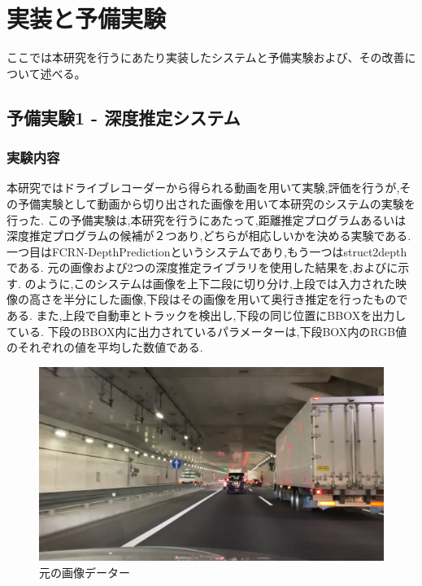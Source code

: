 \chapter{実装と予備実験}
ここでは本研究を行うにあたり実装したシステムと予備実験および、その改善について述べる。
\section{予備実験1 - 深度推定システム}
\subsection{実験内容}
本研究ではドライブレコーダーから得られる動画を用いて実験,評価を行うが,その予備実験として動画から切り出された画像を用いて本研究のシステムの実験を行った.
この予備実験は,本研究を行うにあたって,距離推定プログラムあるいは深度推定プログラムの候補が２つあり,どちらが相応しいかを決める実験である.
一つ目はFCRN-DepthPrediction\cite{laina2016deeper}というシステムであり,もう一つはstruct2depth\cite{casser2019struct2depth}である.
元の画像および2つの深度推定ライブラリを使用した結果を,およびに示す.
のように,このシステムは画像を上下二段に切り分け,上段では入力された映像の高さを半分にした画像,下段はその画像を用いて奥行き推定を行ったものである.
また,上段で自動車とトラックを検出し,下段の同じ位置にBBOXを出力している.
下段のBBOX内に出力されているパラメーターは,下段BOX内のRGB値のそれぞれの値を平均した数値である.
\newpage

\begin{figure}[htbp]
  \begin{center}
    \includegraphics[width=12cm]{figs/depth_raw.png}
   \end{center}
   \caption{元の画像データー}
   \label{fig:depth_raw}
  \end{figure}

